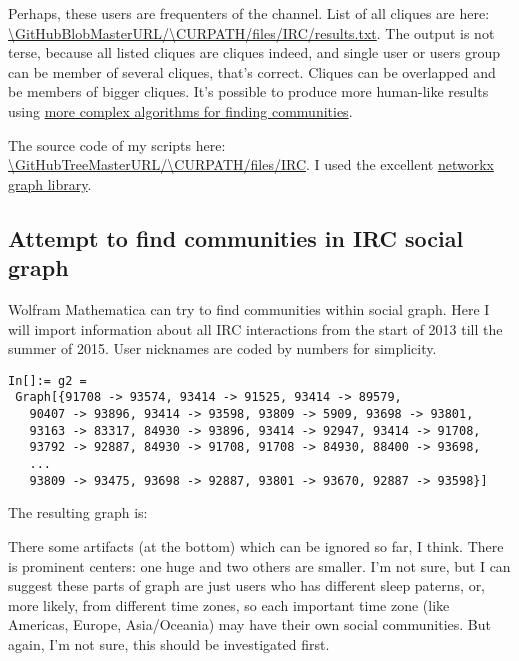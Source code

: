 Perhaps, these users are frequenters of the channel. List of all cliques are here:
\url{\GitHubBlobMasterURL/\CURPATH/files/IRC/results.txt}.
The output is not terse, because all listed cliques are cliques indeed, and single user or users group can be member of several cliques, that's correct.
Cliques can be overlapped and be members of bigger cliques.
It's possible to produce more human-like results using 
\href{https://en.wikipedia.org/wiki/Community_structure#Algorithms_for_finding_communities}{more complex algorithms for finding communities}.

The source code of my scripts here: \url{\GitHubTreeMasterURL/\CURPATH/files/IRC}.
I used the excellent \href{https://networkx.github.io/}{networkx graph library}.

\subsection{Attempt to find communities in IRC social graph}

Wolfram Mathematica can try to find communities within social graph.
Here I will import information about all IRC interactions from the start of 2013 till the summer of 2015.
User nicknames are coded by numbers for simplicity.

\begin{lstlisting}
In[]:= g2 = 
 Graph[{91708 -> 93574, 93414 -> 91525, 93414 -> 89579, 
   90407 -> 93896, 93414 -> 93598, 93809 -> 5909, 93698 -> 93801, 
   93163 -> 83317, 84930 -> 93896, 93414 -> 92947, 93414 -> 91708, 
   93792 -> 92887, 84930 -> 91708, 91708 -> 84930, 88400 -> 93698, 
   ...
   93809 -> 93475, 93698 -> 92887, 93801 -> 93670, 92887 -> 93598}]
\end{lstlisting}

The resulting graph is:

\begin{figure}[H]
\centering
{}
\end{figure}

There some artifacts (at the bottom) which can be ignored so far, I think.
There is prominent centers: one huge and two others are smaller.
I'm not sure, but I can suggest these parts of graph are just users who has different sleep paterns, or, more likely, from different time zones,
so each important time zone (like Americas, Europe, Asia/Oceania) may have their own social communities.
But again, I'm not sure, this should be investigated first.

